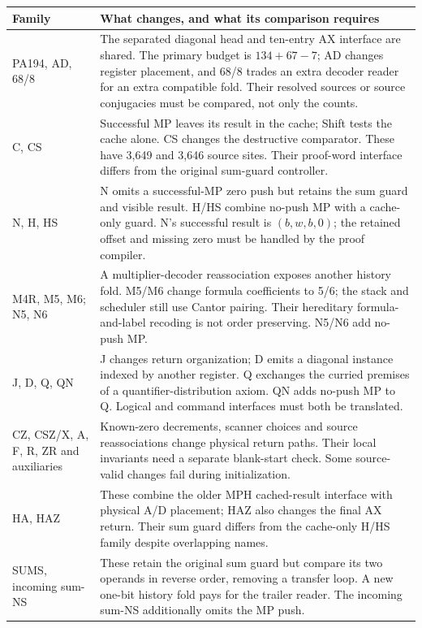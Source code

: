 \begin{longtable}{@{}p{.23\linewidth}p{.71\linewidth}@{}}
\toprule Family & What changes, and what its comparison requires\\\midrule\endhead
PA194, AD, 68/8 & The separated diagonal head and ten-entry AX interface are shared. The primary budget is $134+67-7$; AD changes register placement, and 68/8 trades an extra decoder reader for an extra compatible fold. Their resolved sources or source conjugacies must be compared, not only the counts.\\
C, CS & Successful MP leaves its result in the cache; Shift tests the cache alone. CS changes the destructive comparator. These have 3,649 and 3,646 source sites. Their proof-word interface differs from the original sum-guard controller.\\
N, H, HS & N omits a successful-MP zero push but retains the sum guard and visible result. H/HS combine no-push MP with a cache-only guard. N's successful result is $(b,w,b,0)$; the retained offset and missing zero must be handled by the proof compiler.\\
M4R, M5, M6; N5, N6 & A multiplier-decoder reassociation exposes another history fold. M5/M6 change formula coefficients to 5/6; the stack and scheduler still use Cantor pairing. Their hereditary formula-and-label recoding is not order preserving. N5/N6 add no-push MP.\\
J, D, Q, QN & J changes return organization; D emits a diagonal instance indexed by another register. Q exchanges the curried premises of a quantifier-distribution axiom. QN adds no-push MP to Q. Logical and command interfaces must both be translated.\\
CZ, CSZ/X, A, F, R, ZR and auxiliaries & Known-zero decrements, scanner choices and source reassociations change physical return paths. Their local invariants need a separate blank-start check. Some source-valid changes fail during initialization.\\
HA, HAZ & These combine the older MPH cached-result interface with physical A/D placement; HAZ also changes the final AX return. Their sum guard differs from the cache-only H/HS family despite overlapping names.\\
SUMS, incoming sum-NS & These retain the original sum guard but compare its two operands in reverse order, removing a transfer loop. A new one-bit history fold pays for the trailer reader. The incoming sum-NS additionally omits the MP push.\\
\bottomrule
\end{longtable}

